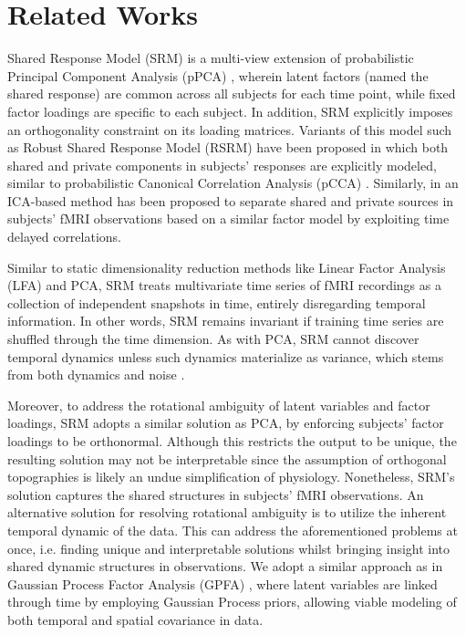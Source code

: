 \section{Related Works}
\label{ch1:sec:related_models}
Shared Response Model (SRM) \cite{srm} is a multi-view extension of probabilistic Principal Component Analysis (pPCA) \cite{ppca}, wherein latent factors (named the shared response) are common across all subjects for each time point, while fixed factor loadings are specific to each subject. In addition, SRM explicitly imposes an orthogonality constraint on its loading matrices. Variants of this model such as Robust Shared Response Model (RSRM) \cite{rsrm} have been proposed in which both shared and private components in subjects' responses are explicitly modeled, similar to probabilistic Canonical Correlation Analysis (pCCA) \cite{pcca}. Similarly, in \cite{lukic2002ica} an ICA-based method has been proposed to separate shared and private sources in subjects' fMRI observations based on a similar factor model by exploiting time delayed correlations.

Similar to static dimensionality reduction methods like Linear Factor Analysis (LFA) and PCA, SRM treats multivariate time series of fMRI recordings as a collection of independent snapshots in time, entirely disregarding temporal information. In other words, SRM remains invariant if training time series are shuffled through the time dimension. As with PCA, SRM cannot discover temporal dynamics unless such dynamics materialize as variance, which stems from both dynamics and noise \cite{dca}. 

Moreover, to address the rotational ambiguity of latent variables and factor loadings, SRM adopts a similar solution as PCA, by enforcing subjects' factor loadings to be orthonormal. Although this restricts the output to be unique, the resulting solution may not be interpretable since the assumption of orthogonal topographies is likely an undue simplification of physiology. Nonetheless, SRM's solution captures the shared structures in subjects' fMRI observations. An alternative solution for resolving rotational ambiguity is to utilize the inherent temporal dynamic of the data. This can address the aforementioned problems at once, i.e. finding unique and interpretable solutions whilst bringing insight into shared dynamic structures in observations. We adopt a similar approach as in Gaussian Process Factor Analysis (GPFA) \cite{gpfa}, where latent variables are linked through time by employing Gaussian Process priors, allowing viable modeling of both temporal and spatial covariance in data.

